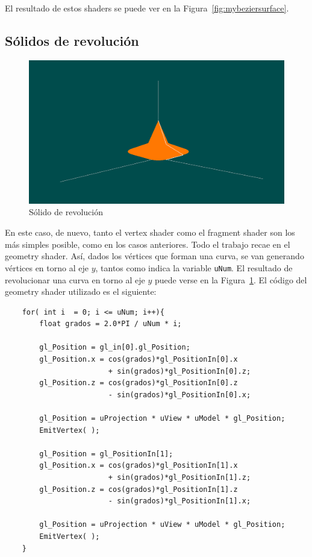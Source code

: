 El resultado de estos shaders se puede ver en la
Figura~\ref{fig:mybeziersurface}.

\subsection{Sólidos de revolución}
\label{makereference5.5.4}

\begin{figure}
	\centering		
	\includegraphics[width=\textwidth]{figures/myrevolution.png}
	\caption{Sólido de revolución}
	\label{fig:myrevolution}
\end{figure}

En este caso, de nuevo, tanto el vertex shader como el fragment shader son los
más simples posible, como en los casos anteriores. Todo el trabajo recae en el
geometry shader. Así, dados los vértices que forman una curva, se van generando
vértices en torno al eje $y$, tantos como indica la variable \verb|uNum|. El
resultado de revolucionar una curva en torno al eje $y$ puede verse en la
Figura~\ref{fig:myrevolution}. El código del geometry shader utilizado es el
siguiente:

\begin{verbatim}
    for( int i  = 0; i <= uNum; i++){
        float grados = 2.0*PI / uNum * i;
        
        gl_Position = gl_in[0].gl_Position;
        gl_Position.x = cos(grados)*gl_PositionIn[0].x 
		                + sin(grados)*gl_PositionIn[0].z;
        gl_Position.z = cos(grados)*gl_PositionIn[0].z 
		                - sin(grados)*gl_PositionIn[0].x;

        gl_Position = uProjection * uView * uModel * gl_Position;
        EmitVertex( );
        
        gl_Position = gl_PositionIn[1];
        gl_Position.x = cos(grados)*gl_PositionIn[1].x 
		                + sin(grados)*gl_PositionIn[1].z;
        gl_Position.z = cos(grados)*gl_PositionIn[1].z 
		                - sin(grados)*gl_PositionIn[1].x;

        gl_Position = uProjection * uView * uModel * gl_Position;
        EmitVertex( );
    }
\end{verbatim}

